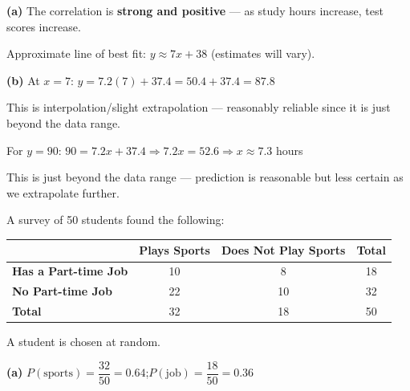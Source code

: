 \documentclass[addpoints]{exam}
\begin{document}
\begin{questions}
\begin{solution}[8cm]
\textbf{(a)} The correlation is \textbf{strong and positive} — as study hours increase, test scores increase.

Approximate line of best fit: $y \approx 7x + 38$ (estimates will vary).

\textbf{(b)} At $x = 7$: $y = 7.2(7) + 37.4 = 50.4 + 37.4 = \mathbf{87.8}$

This is interpolation/slight extrapolation — reasonably reliable since it is just beyond the data range.

For $y = 90$: $90 = 7.2x + 37.4 \Rightarrow 7.2x = 52.6 \Rightarrow x \approx \mathbf{7.3}$ hours

This is just beyond the data range — prediction is reasonable but less certain as we extrapolate further.
\end{solution}

\question[6] A survey of 50 students found the following:
\begin{center}
\begin{tabular}{@{}lccc@{}}
\toprule
 & \textbf{Plays Sports} & \textbf{Does Not Play Sports} & \textbf{Total} \\
\midrule
\textbf{Has a Part-time Job} & 10 & 8 & 18 \\
\textbf{No Part-time Job} & 22 & 10 & 32 \\
\textbf{Total} & 32 & 18 & 50 \\
\bottomrule
\end{tabular}
\end{center}
A student is chosen at random.
\begin{solution}[8cm]
\textbf{(a)} $P(\text{sports}) = \dfrac{32}{50} = \mathbf{0.64}$;\quad $P(\text{job}) = \dfrac{18}{50} = \mathbf{0.36}$


\end{solution}
\end{questions}
\end{document}
